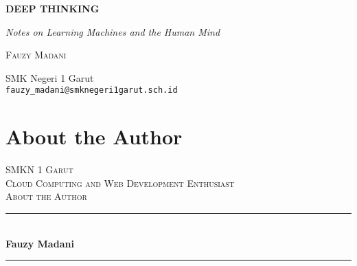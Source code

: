\documentclass{book}
\begin{document}
\begin{titlepage}
\centering
\vspace*{3cm}
{\Huge\bfseries DEEP THINKING\par}
\vspace{0.5cm}
{\Large\itshape Notes on Learning Machines and the Human Mind\par}
\vspace{2cm}
{\LARGE\scshape Fauzy Madani\par}
\vfill
{\Large SMK Negeri 1 Garut \\ \texttt{fauzy\_madani@smknegeri1garut.sch.id}}
\vspace*{2cm}

\end{titlepage}
\clearpage

\chapter*{About the Author}

\vspace{2em}

\newcommand{\HRule}{\rule{\linewidth}{0.5mm}}

\begin{center}
  \textsc{\LARGE SMKN 1 Garut}\\[1.5cm] %
  
  \textsc{\Large Cloud Computing and Web Development Enthusiast}\\[0.5cm] %
  
  \textsc{\large About the Author}\\[0.5cm] %
  
  \HRule\\[0.4cm]
  
  {\huge\bfseries Fauzy Madani}\\[0.4cm] %
  
  \HRule\\[1.5cm]
\end{center}
\end{document}
